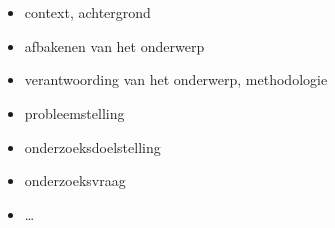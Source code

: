 
\chapter{}%
\label{ch:inleiding}




\begin{itemize}
  \item context, achtergrond
  \item afbakenen van het onderwerp
  \item verantwoording van het onderwerp, methodologie
  \item probleemstelling
  \item onderzoeksdoelstelling
  \item onderzoeksvraag
  \item \ldots
\end{itemize}

\section{}%
\label{sec:probleemstelling}

